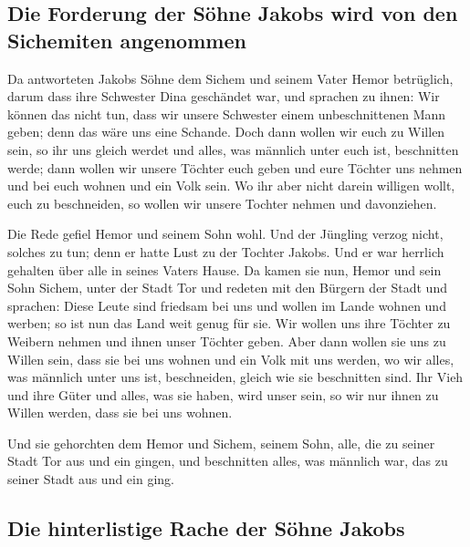 \hypertarget{die-forderung-der-suxf6hne-jakobs-wird-von-den-sichemiten-angenommen}{%
\subsection{Die Forderung der Söhne Jakobs wird von den Sichemiten
angenommen}\label{die-forderung-der-suxf6hne-jakobs-wird-von-den-sichemiten-angenommen}}

 Da antworteten Jakobs Söhne dem Sichem und seinem Vater
Hemor betrüglich, darum dass ihre Schwester Dina geschändet war,
 und sprachen zu ihnen: Wir können das nicht tun, dass
wir unsere Schwester einem unbeschnittenen Mann geben; denn das wäre uns
eine Schande.  Doch dann wollen wir euch zu Willen sein,
so ihr uns gleich werdet und alles, was männlich unter euch ist,
beschnitten werde;  dann wollen wir unsere Töchter euch
geben und eure Töchter uns nehmen und bei euch wohnen und ein Volk sein.
 Wo ihr aber nicht darein willigen wollt, euch zu
beschneiden, so wollen wir unsere Tochter nehmen und davonziehen.

 Die Rede gefiel Hemor und seinem Sohn wohl.
 Und der Jüngling verzog nicht, solches zu tun; denn er
hatte Lust zu der Tochter Jakobs. Und er war herrlich gehalten über alle
in seines Vaters Hause.  Da kamen sie nun, Hemor und sein
Sohn Sichem, unter der Stadt Tor und redeten mit den Bürgern der Stadt
und sprachen:  Diese Leute sind friedsam bei uns und
wollen im Lande wohnen und werben; so ist nun das Land weit genug für
sie. Wir wollen uns ihre Töchter zu Weibern nehmen und ihnen unser
Töchter geben.  Aber dann wollen sie uns zu Willen sein,
dass sie bei uns wohnen und ein Volk mit uns werden, wo wir alles, was
männlich unter uns ist, beschneiden, gleich wie sie beschnitten sind.
 Ihr Vieh und ihre Güter und alles, was sie haben, wird
unser sein, so wir nur ihnen zu Willen werden, dass sie bei uns wohnen.

 Und sie gehorchten dem Hemor und Sichem, seinem Sohn,
alle, die zu seiner Stadt Tor aus und ein gingen, und beschnitten alles,
was männlich war, das zu seiner Stadt aus und ein ging.

\hypertarget{die-hinterlistige-rache-der-suxf6hne-jakobs}{%
\subsection{Die hinterlistige Rache der Söhne
Jakobs}\label{die-hinterlistige-rache-der-suxf6hne-jakobs}}

